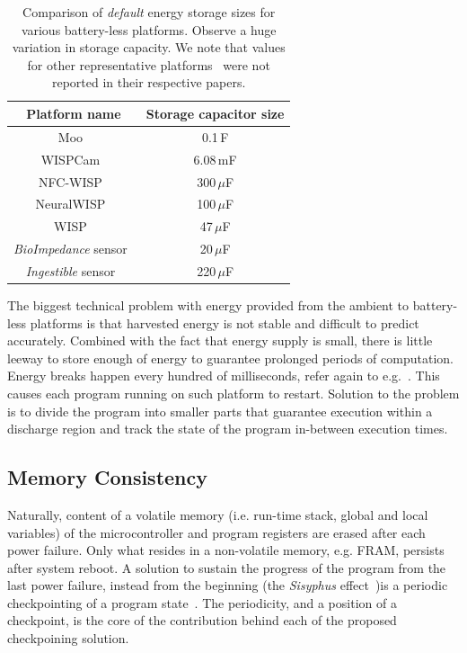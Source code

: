 \begin{table}
	\centering
	\begin{tabular}{|c|c|}
	\hline
	Platform name & Storage capacitor size \\
	\hline \hline
	Moo~\cite{moo} & 0.1\,F \\
	WISPCam~\cite{naderiparizi_rfid_2015} & 6.08\,mF \\ %
	NFC-WISP~\cite{zhao_rfid_2015} & 300\,$\mu$F \\
	NeuralWISP~\cite{holleman_biocas_2008} & 100\,$\mu$F \\
	WISP~\cite{wisp5} & 47\,$\mu$F \\
	{\em BioImpedance} sensor~\cite{rodriguez_tbcs_2015} & 20\,$\mu$F \\
	{\em Ingestible} sensor~\cite{nadeau_naturebio_2017} & 220\,$\mu$F\\
	\hline
	\end{tabular} 
\caption{Comparison of {\em default} energy storage sizes for various battery-less platforms. Observe a huge variation in storage capacity. We note that values for other representative platforms~\cite{medusa_farsens_2017,talla_imwut_2017,liu_sigcomm_2013,parks_sigcomm_2014} were not reported in their respective papers.}
\label{table:capacitor}
\end{table}

The biggest technical problem with energy provided from the ambient to battery-less platforms is that harvested energy is not stable and difficult to predict accurately. Combined with the fact that energy supply is small, there is little leeway to store enough of energy to guarantee prolonged periods of computation. Energy breaks happen every hundred of milliseconds, refer again to e.g.~\cite[Fig. 1]{mementos}. This causes each program running on such platform to restart. Solution to the problem is to divide the program into smaller parts that guarantee execution within a discharge region and track the state of the program in-between execution times.

\subsection{Memory Consistency}
\label{sec:background_consistency}

Naturally, content of a volatile memory (i.e. run-time stack, global and local variables) of the microcontroller and program registers are erased after each power failure. Only what resides in a non-volatile memory, e.g. FRAM, persists after system reboot. A solution to sustain the progress of the program from the last power failure, instead from the beginning (the \emph{Sisyphus} effect~\cite[Sec. 2]{mementos})is a periodic checkpointing of a program state~\cite{mementos,hibernusplusplus,quickrecall,idetic}. The periodicity, and a position of a checkpoint, is the core of the contribution behind each of the proposed checkpoining solution. 


